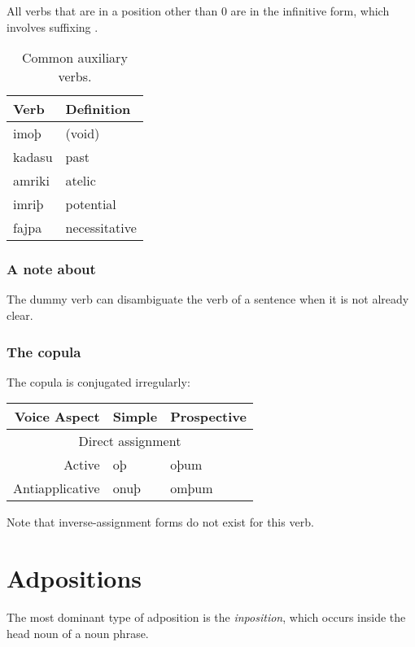 \documentclass{book}
\begin{document}
All verbs that are in a position other than 0 are in the infinitive form, which involves suffixing .

\begin{table}
  \caption{Common auxiliary verbs.}
  \centering
  \begin{tabular}{ll}
    Verb & Definition \\
    \hline
    imoþ & (void) \\
    kadasu & past \\
    amriki & atelic \\
    imriþ & potential \\
    fajpa & necessitative \\
  \end{tabular}
\end{table}

\subsection{A note about }

The dummy verb  can disambiguate the verb of a sentence when it is not already clear.

\subsection{The copula}

The copula  is conjugated irregularly:

\begin{tablenf}
  \caption{Conjugations of .}
  \centering
  \begin{tabular}{r|ll}
    Voice \bs{} Aspect & Simple & Prospective \\
    \hline
    \multicolumn{3}{c}{Direct assignment} \\
    \hline
    Active & oþ & oþum \\
    Antiapplicative & onuþ & omþum \\
  \end{tabular}
\end{tablenf}

Note that inverse-assignment forms do not exist for this verb.

\chapter{Adpositions}

The most dominant type of adposition is the \emph{inposition}, which occurs inside the head noun of a noun phrase.
\end{document}
